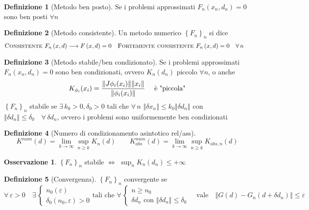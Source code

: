 \documentclass[a4paper,10pt]{article}
\theoremstyle{definition}
\theoremstyle{indentdefinition}
\newtheorem{defn}{Definizione}[section]
\theoremstyle{indenttheorem}
\theoremstyle{myremark}
\newtheorem*{rem*}{Osservazione}
\theoremstyle{indentgeneral}
\theoremstyle{plain}
\theoremstyle{plain}
\begin{document}
\begin{defn}[Metodo ben posto]
    Se i problemi approssimati $F_{n}\left(x_{n},d_{n}\right)=0$ sono ben posti $\forall n$
\end{defn}



\begin{defn}[Metodo consistente]
Un metodo numerico $\left\{ F_{n}\right\} _{n}$ si dice
\begin{align*}
\textsc{Consistente } & F_{n}\left(x,d\right)\longrightarrow F\left(x,d\right)=0 & \textsc{Fortemente consistente } & F_{n}\left(x,d\right)=0\quad\forall\,n
\end{align*}
\end{defn}

\begin{defn}[Metodo stabile/ben condizionato] Se i problemi approssimati $F_{n}\left(x_{n},d_{n}\right)=0$ sono ben condizionati, ovvero $K_n(d_n)$ piccolo $\forall n$, o anche
$$K_{\phi_i}(x_i)=\frac{\norm{J\phi_i(x_i)}\norm{x_i}}{\norm{\phi_i(x_i)}} \quad \text{ è "piccola"}$$
 $\left\{ F_{n}\right\} _{n}$ stabile se $\exists\,k_{0}>0,\delta_{0}>0$
tali che $\forall\,n$ $\left\Vert \delta x_{n}\right\Vert \leq k_{0}\left\Vert \delta d_{n}\right\Vert $
con $\left\Vert \delta d_{n}\right\Vert \leq\delta_{0}\quad\forall\,\delta d_{n}$,
ovvero i problemi sono uniformemente ben condizionati
\end{defn}



\begin{defn}[Numero di condizionamento asintotico rel/ass]
    $$K^{num}(d)=\lim_{k\to\infty}\sup_{n\ge k}K_n(d) \quad \quad K^{num}_{abs}(d)=\lim_{k\to \infty}\sup_{n\ge k}K_{abs,n}(d)$$
\end{defn}


\begin{rem*}
$\left\{ F_{n}\right\} _{n}$ stabile $\Longleftrightarrow$ $\sup_{n}K_{n}\left(d_{n}\right)\leq+\infty$
\end{rem*}
\begin{defn}[Convergenza]
$\left\{ F_{n}\right\} _{n}$ convergente se $$\forall\,\varepsilon>0\quad\exists\,\begin{cases}
n_{0}(\varepsilon) \\
\delta_{0}(n_0,\varepsilon)>0
\end{cases}  \text{
tali che } \forall\,\begin{cases}
    n\geq n_{0} \\
    \delta d_{n} \text{ con } \left\Vert \delta d_{n}\right\Vert \leq\delta_{0}
\end{cases} \quad \text{vale} \quad 
\left\Vert G\left(d\right)-G_{n}\left(d+\delta d_{n}\right)\right\Vert \leq\varepsilon$$
\end{defn}
\end{document}
